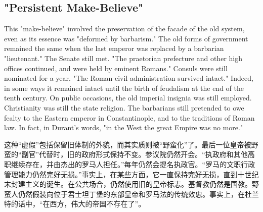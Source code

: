 \subsection{"Persistent Make-Believe"}
\begin{paracol}{2}
This "make-believe" involved the preservation of the facade of the old system, even as its essence was "deformed by barbarism." The old forms of government remained the same when the last emperor was replaced by a barbarian "lieutenant." The Senate still met. "The praetorian prefecture and other high offices continued, and were held by eminent Romans." Consuls were still nominated for a year. "The Roman civil administration survived intact." Indeed, in some ways it remained intact until the birth of feudalism at the end of the tenth century. On public occasions, the old imperial insignia was still employed. Christianity was still the state religion. The barbarians still pretended to owe fealty to the Eastern emperor in Constantinople, and to the traditions of Roman law. In fact, in Durant's words, "in the West the great Empire was no more." 

\switchcolumn
这种“虚假”包括保留旧体制的外貌，而其实质则被“野蛮化”了。最后一位皇帝被野蛮的“副官”代替时，旧的政府形式保持不变。参议院仍然开会。“执政府和其他高职继续存在，并由杰出的罗马人担任。”每年仍然会提名执政官。“罗马的文职行政管理能力仍然完好无损。”事实上，在某些方面，它一直保持完好无损，直到十世纪末封建主义的诞生。在公共场合，仍然使用旧的皇帝标志。基督教仍然是国教。野蛮人仍然假装向位于君士坦丁堡的东部皇帝和罗马法的传统效忠。事实上，在杜兰特的话中，“在西方，伟大的帝国不存在了”。

\end{paracol}

  

